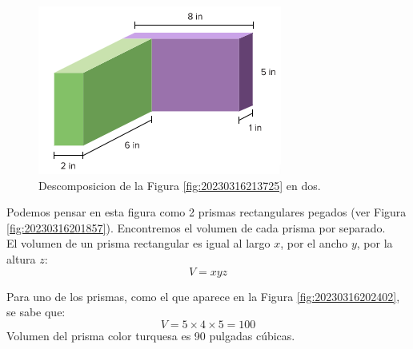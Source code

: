 \begin{solutionbox}{16cm}
    \begin{minipage}[t]{.3\textwidth}
        \begin{figure}[H]
            \centering
            \includegraphics[width=0.9\linewidth]{../images/20230316213809}
            \caption{Descomposicion de la Figura \ref{fig:20230316213725} en dos.}
            \label{fig:20230316213809}
        \end{figure}
    \end{minipage}\hfill
    \begin{minipage}[t]{.55\textwidth}
        Podemos pensar en esta figura como 2 prismas rectangulares pegados (ver Figura \ref{fig:20230316201857}). Encontremos el volumen de cada prisma por separado.\\
        El volumen de un prisma rectangular es igual al largo $x$, por el ancho $y$, por la altura $z$:
        \[ V = xyz \]

        Para uno de los prismas, como el que aparece en la Figura \ref{fig:20230316202402}, se sabe que:\\
        \[ V = 5\times 4\times 5=100\]
        Volumen del prisma color turquesa es 90 pulgadas cúbicas.\\


\end{minipage}
\end{solutionbox}
